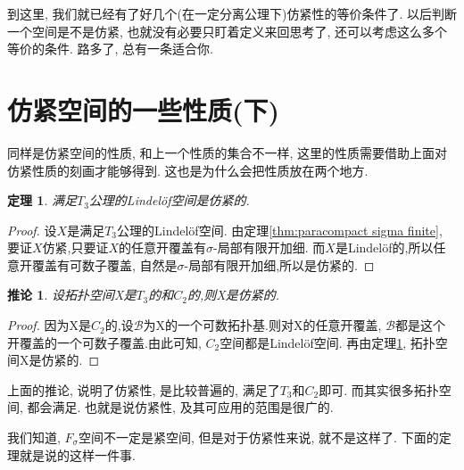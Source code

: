 \documentclass[a4paper,UTF8]{ctexart}
\newtheorem{thm}[theorem]{定理} %
\newtheorem{corollary}[theorem]{推论}
\begin{document}
到这里, 我们就已经有了好几个(在一定分离公理下)仿紧性的等价条件了.
以后判断一个空间是不是仿紧, 也就没有必要只盯着定义来回思考了,
还可以考虑这么多个等价的条件. 路多了, 总有一条适合你.

\section{仿紧空间的一些性质(下)}

同样是仿紧空间的性质, 和上一个性质的集合不一样,
这里的性质需要借助上面对仿紧性质的刻画才能够得到.
这也是为什么会把性质放在两个地方.

\begin{thm} \label{thm:T3 Lindelof}
  满足$T_3$公理的Lindel\"{o}f空间是仿紧的.
\end{thm}
\begin{proof}
  设$X$是满足$T_3$公理的Lindel\"{o}f空间.
  由定理\ref{thm:paracompact sigma finite},
  要证$X$仿紧,只要证$X$的任意开覆盖有$\sigma$-局部有限开加细.
  而$X$是Lindel\"{o}f的,所以任意开覆盖有可数子覆盖,
  自然是$\sigma$-局部有限开加细,所以是仿紧的.
\end{proof}

\begin{corollary}
  设拓扑空间X是$T_3$的和$C_2$的,则X是仿紧的.
\end{corollary}
\begin{proof}
  因为X是$C_2$的,设$\mathscr{B}$为X的一个可数拓扑基.则对X的任意开覆盖,
  $\mathscr{B}$都是这个开覆盖的一个可数子覆盖.由此可知, $C_2$空间都是Lindel\"{o}f空间.
  再由定理\ref{thm:T3 Lindelof}, 拓扑空间X是仿紧的.
\end{proof}

上面的推论, 说明了仿紧性, 是比较普遍的, 满足了$T_3$和$C_2$即可.
而其实很多拓扑空间, 都会满足. 也就是说仿紧性, 及其可应用的范围是很广的.

我们知道, $F_\sigma$空间不一定是紧空间, 但是对于仿紧性来说, 就不是这样了.
下面的定理就是说的这样一件事.
\end{document}
